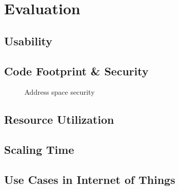\chapter{Evaluation}\label{chapter:evaluation}
\section{Usability}
\section{Code Footprint \& Security}


\begin{figure}[htbp]
    \centering
    \hfill
    \caption{Address space security}
  \end{figure}


\section{Resource Utilization}
\section{Scaling Time}
\section{Use Cases in Internet of Things}